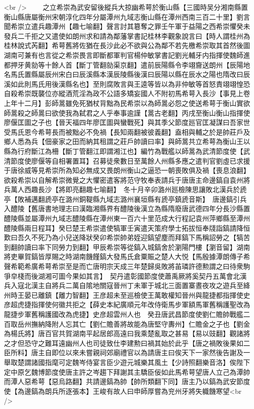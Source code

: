 <br />
　　之立希崇為武安留後縱兵大掠幽希萼於衡山縣【三國時吴分湘南縣置衡山縣唐屬衡州宋朝淳化四年分屬潭州九域志衡山縣在潭州西南三百二十里】劉言聞希崇立遣兵趣潭州【趣七喻翻】聲言討其簒奪之罪壬午軍于益陽之西希崇懼癸未發兵二千拒之又遣使如朗州求和請為鄰藩掌書記桂林李觀象說言曰【時人謂桂州為桂林說式芮翻】希萼舊將佐猶在長沙此必不欲與公為鄰不若先檄希崇取其首然後圖湖南可兼有也言從之希崇畏言即斷都軍判官楊仲敏掌書記劉光輔牙内指揮使魏師進都押牙黄勍等十餘人首【斷丁管翻勍渠京翻】遣前辰陽縣令李翊齎送朗州【辰陽地名馬氏置縣屬辰州宋白曰辰溪縣本漢辰陵縣後漢曰辰陽以縣在辰水之陽也隋改曰辰溪如此則馬氏用後漢縣名也】至則腐敗言與王逵等皆以為非仲敏等首怒責翊翊惶恐自殺希崇既襲位亦縱酒荒淫為政不公語多矯妄國人不附初馬希萼入長沙【事見上卷上年十二月】彭師暠雖免死猶杖背黜為民希崇以為師暠必怨之使送希萼于衡山實欲師暠殺之師暠曰欲使我為弑君之人乎奉事逾謹【暠古老翻】丙戌至衡山衡山指揮使廖偃匡圖之子也【晉天福四年廖匡圖與蠻戰死】與其季父節度廵官匡凝謀曰吾家世受馬氏恩今希萼長而被黜必不免禍【長知兩翻被彼義翻】盍相與輔之於是帥莊戶及鄉人悉為兵【佃豪家之田而納其租謂之莊戶帥讀曰率】與師暠共立希萼為衡山王以縣為行府斷江為柵【斷丁管翻江即謂湘江也】編竹為戰艦以師暠為武清節度使【武清節度使廖偃等自相署置耳】召募徒衆數日至萬餘人州縣多應之遣判官劉虛已求援于唐徐威等見希崇所為知必無成又畏朗州衡山之逼恐一朝喪敗俱及禍【喪息浪翻】欲殺希崇以自解希崇微覺之大懼密遣客將范守牧奉表請兵于唐唐主命邊鎬自袁州將兵萬人西趣長沙【將即亮翻趣七喻翻】　冬十月辛卯潞州廵檢陳思讓敗北漢兵於虒亭【敗補邁翻虒亭在潞州銅鞮縣九域志潞州襄垣縣有虒亭鎮虒音斯】　唐邊鎬引兵入醴陵【舊唐書地理志曰漢臨湘縣界有醴陵後漢立為縣隋廢唐武德四年分長沙縣置醴陵縣並屬潭州九域志醴陵縣在潭州東一百六十里范成大行程記袁州萍鄉縣至潭州醴陵縣兩日程耳】癸巳楚王希崇遣使犒軍壬寅遣天策府學士拓拔恒奉牋詣鎬請降恒歎曰吾久不死乃為小兒送降狀癸卯希崇帥弟姪迎鎬望塵而拜鎬下馬稱詔勞之【犒苦到翻帥讀曰率下同勞力到翻】甲辰希崇等從鎬入城鎬舍於瀏陽門樓【瀏音留】湖南將吏畢賀鎬皆厚賜之時湖南饑饉鎬大發馬氏倉粟賑之楚人大悦【馬殷據潭朗傳子希聲希範希廣希萼希崇至是而亡唐明宗天成三年楚歸吳敗將苖璘許德勲謂之曰待衆駒爭皁棧而後湖湘可圖今果如其言】　契丹遣彰國節度使蕭禹厥將奚契丹五萬會北漢兵入寇北漢主自將兵二萬自隂地關寇晉州丁未軍于城北三面置寨晝夜攻之遊兵至絳州時王晏已離鎮【離力智翻】王彦超未至巡檢使王萬敢權知晉州與龍捷都指揮使史彦超虎捷指揮使何徽共拒之【薛史本紀廣順元年改侍衛馬步軍額馬軍舊稱護聖改為龍捷步軍舊稱護國改為虎捷】史彦超雲州人也　癸丑唐武昌節度使劉仁贍帥戰艦二百取岳州撫納降附人忘其亡【劉仁贍善將故能為唐堅守夀州】仁贍金之子也【劉金為楊氏將】唐百官共賀湖南平起居郎高遠曰我乘楚亂取之甚易【易以豉翻】觀諸將之才但恐守之難耳遠幽州人也司徒致仕李建勲曰禍其始於此乎【唐之禍敗後果如二臣所料】唐主自即位以來未嘗親祠郊廟禮官以為請唐主曰俟天下一家然後告謝及一舉取楚謂諸國指麾可定魏岑侍宴言臣少遊元城樂其風土【少詩照翻樂音洛】俟陛下定中原乞魏博節度使唐主許之岑趨下拜謝其主驕臣佞如此馬希萼望唐人立己為潭帥而潭人惡希萼【惡烏路翻】共請邊鎬為帥【帥所類翻下同】唐主乃以鎬為武安節度使【為邊鎬為朗兵所逐張本】王峻有故人曰申師厚嘗為兖州牙將失軄饑寒望<br />
